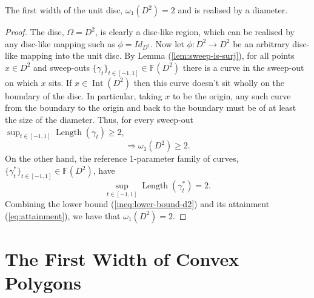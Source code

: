 \begin{theorem}
The first width of the unit disc, $\omega_{1}(D^2) = 2$ and is realised by a diameter.
\end{theorem}
\begin{proof}
The disc, $\Omega = D^2$, is clearly a disc-like region, which can be realised by any disc-like mapping such as $\phi=Id_{D^2}$. Now let $\phi:D^2\to D^2$ be an arbitrary disc-like mapping into the unit disc. By Lemma (\ref{lem:sweep-is-surj}), for all points $x\in D^2$ and sweep-outs $\{\gamma_t\}_{t\in[-1,1]} \in \mathbb{F}(D^2)$ there is a curve in the sweep-out on which $x$ sits. If $x\in \operatorname{Int}(D^2)$ then this curve doesn't sit wholly on the boundary of the disc. In particular, taking $x$ to be the origin, any such curve from the boundary to the origin and back to the boundary must be of at least the size of the diameter. Thus, for every sweep-out $\sup_{{t\in[-1,1]}}\operatorname{Length}(\gamma_t) \geq 2$, 
\begin{equation}\label{ineq:lower-bound-d2}
\Rightarrow \omega_1(D^2)\geq2.
\end{equation}
On the other hand, the reference 1-parameter family of curves, $\{\gamma_t^*\}_{t\in[-1,1]} \in \mathbb{F}(D^2)$, have 
\begin{equation}\label{eq:attainment}
\sup_{{t\in[-1,1]}}\operatorname{Length}(\gamma_t^*) = 2.
\end{equation}
Combining the lower bound (\ref{ineq:lower-bound-d2}) and its attainment (\ref{eq:attainment}), we have that $\omega_1(D^2)=2$.
\end{proof}

\section{The First Width of Convex Polygons}

